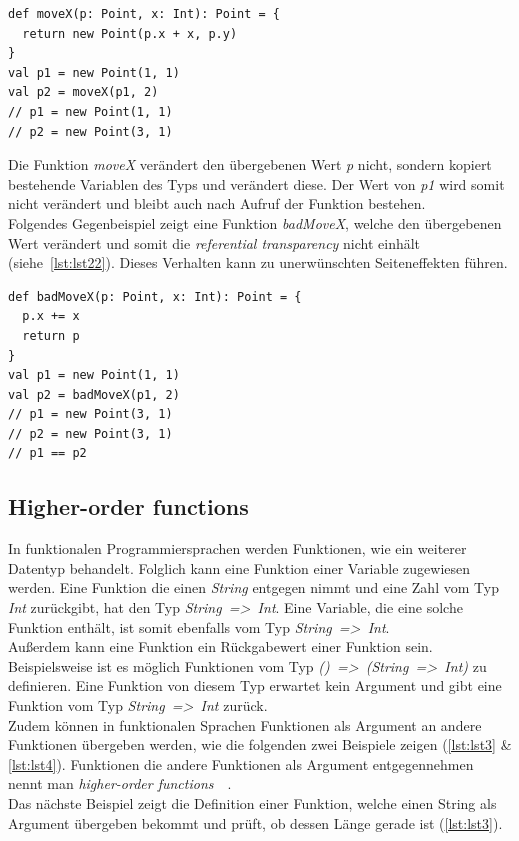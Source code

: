 \begin{lstlisting}[caption={Beispiel einer Funktion mit \textit{referential transparency}.},label={lst:lst2}]
def moveX(p: Point, x: Int): Point = {
  return new Point(p.x + x, p.y)
}
val p1 = new Point(1, 1)
val p2 = moveX(p1, 2)
// p1 = new Point(1, 1)
// p2 = new Point(3, 1)
\end{lstlisting}

Die Funktion \textit{moveX} verändert den übergebenen Wert \textit{p} nicht, sondern kopiert bestehende Variablen des Typs und verändert diese. Der Wert von \textit{p1} wird somit nicht verändert und bleibt auch nach Aufruf der Funktion bestehen.\\
Folgendes Gegenbeispiel zeigt eine Funktion \textit{badMoveX}, welche den übergebenen Wert verändert und somit die \textit{referential transparency} nicht einhält (siehe~\autoref{lst:lst22}). Dieses Verhalten kann zu unerwünschten Seiteneffekten führen.

\begin{lstlisting}[caption={Beispiel einer Funktion ohne \textit{referential transparency}.},label={lst:lst22}]
def badMoveX(p: Point, x: Int): Point = {
  p.x += x
  return p
}
val p1 = new Point(1, 1)
val p2 = badMoveX(p1, 2)
// p1 = new Point(3, 1)
// p2 = new Point(3, 1)
// p1 == p2
\end{lstlisting}

\pagebreak

\subsection{Higher-order functions}
In funktionalen Programmiersprachen werden Funktionen, wie ein weiterer Datentyp behandelt. Folglich kann eine Funktion einer Variable zugewiesen werden. Eine Funktion die einen \textit{String} entgegen nimmt und eine Zahl vom Typ \textit{Int} zurückgibt, hat den Typ \textit{String~=>~Int}. Eine Variable, die eine solche Funktion enthält, ist somit ebenfalls vom Typ \textit{String~=>~Int}.\\
Außerdem kann eine Funktion ein Rückgabewert einer Funktion sein. Beispielsweise ist es möglich Funktionen vom Typ \textit{()~=>~(String~=>~Int)} zu definieren. Eine Funktion von diesem Typ erwartet kein Argument und gibt eine Funktion vom Typ \textit{String~=>~Int} zurück.\\
Zudem können in funktionalen Sprachen Funktionen als Argument an andere Funktionen übergeben werden, wie die folgenden zwei Beispiele zeigen (\autoref{lst:lst3} \& \ref{lst:lst4}). Funktionen die andere Funktionen als Argument entgegennehmen nennt man \textit{higher-order functions}~\cite[S.~50]{butcher_seven_2014}~\cite[S.~3~\&~S.~19]{chiusano_functional_2015}.\\
Das nächste Beispiel zeigt die Definition einer Funktion, welche einen String als Argument übergeben bekommt und prüft, ob dessen Länge gerade ist (\ref{lst:lst3}).

